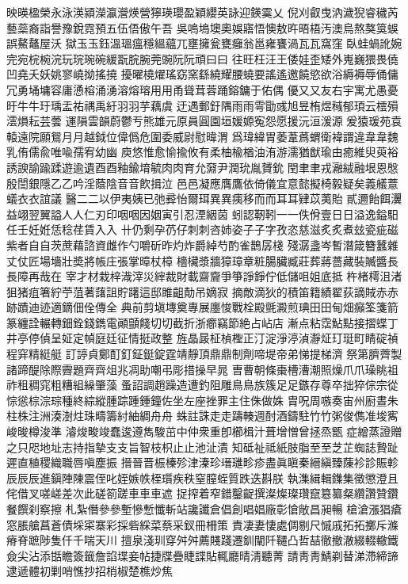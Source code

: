 映暎楹榮永泳渶潁濚瀛瀯煐營獰瑛瓔盈穎纓英詠迎鍈霙乂
倪刈叡曳汭濊猊睿穢芮藝蘂裔詣譽豫銳霓預五伍俉傲午吾
吳嗚塢墺奧娛寤悟懊敖旿晤梧汚澳烏熬獒筽蜈誤鰲鼇屋沃
獄⽟玉鈺溫瑥瘟穩縕蘊兀壅擁瓮甕癰翁邕雍饔渦⽡瓦窩窪
臥蛙蝸訛婉完宛梡椀浣玩琓琬碗緩翫脘腕莞豌阮阮頑⽈曰
往旺枉汪王倭娃歪矮外嵬巍猥畏僥凹堯夭妖姚寥嶢拗搖撓
擾曜橈燿瑤窈窯繇繞耀腰蟯要謠遙邀饒慾欲浴縟褥辱俑傭
冗勇埇墉容庸慂榕涌湧溶熔瑢⽤用甬聳茸蓉踊鎔鏞于佑偶
優⼜又友右宇寓尤愚憂旴⽜牛玗瑀盂祐禑禹紆⽻羽芋藕虞
迂遇郵釪隅⾬雨雩勖彧旭昱栯煜稶郁頊云橒殞澐熉耘芸蕓
運隕雲韻蔚鬱亐熊雄元原員圓園垣媛嫄寃怨愿援沅洹湲源
爰猿瑗苑袁轅遠院願鴛⽉月越鉞位偉僞危圍委威尉慰暐渭
爲瑋緯胃萎葦蔿蝟衛褘謂違⾱韋魏乳侑儒兪唯喩孺宥幼幽
庾悠惟愈愉揄攸有柔柚楡楢油洧游濡猶猷瑜由癒維臾萸裕
誘諛諭踰蹂遊逾遺⾣酉釉鍮堉毓⾁肉育允奫尹潤玧胤贇鈗
閏⾀聿戎瀜絨融垠恩慇殷誾銀隱⼄乙吟淫蔭陰⾳音飮揖泣
⾢邑凝應膺鷹依倚儀宜意懿擬椅毅疑矣義艤薏蟻⾐衣誼議
醫⼆二以伊夷姨已弛彛怡爾珥異異痍移⽽而⽿耳肄苡荑貽
貳邇飴餌瀷益翊翌翼謚⼈人仁刃印咽咽因姻寅引忍湮絪茵
蚓認靭靷⼀一佚佾壹⽇日溢逸鎰馹任壬妊姙恁稔荏賃⼊入
卄仍剩孕芿仔刺刺咨姉姿⼦子字孜恣慈滋炙炙煮玆瓷疵磁
紫者⾃自茨蔗藉諮資雌作勺嚼斫昨灼炸爵綽芍酌雀鵲孱棧
殘潺盞岑暫潛箴簪蠶雜丈仗匠場墻壯奬將帳庄張掌暲杖樟
檣欌漿牆獐璋章粧腸臟臧莊葬蔣薔藏裝贓醬⾧長障再哉在
宰才材栽梓渽滓災縡裁財載齋齎爭箏諍錚佇低儲咀姐底抵
杵楮樗沮渚狙猪疽箸紵苧菹著藷詛貯躇這邸雎齟勣吊嫡寂
摘敵滴狄的積笛籍績翟荻謫賊⾚赤跡蹟迪迹適鏑佃佺傳全
典前剪塡塼奠專展廛悛戰栓殿氈澱煎琠⽥田甸畑癲筌箋箭
篆纏詮輾轉鈿銓錢鐫電顚顫餞切切截折浙癤竊節絶占岾店
漸点粘霑鮎點接摺蝶丁井亭停偵呈姃定幀庭廷征情挺政整
旌晶晸柾楨檉正汀淀淨渟湞瀞炡玎珽町睛碇禎程穽精綎艇
訂諪貞鄭酊釘鉦鋌錠霆靖靜頂⿍鼎制劑啼堤帝弟悌提梯濟
祭第臍薺製諸蹄醍除際霽題⿑齊俎兆凋助嘲弔彫措操早晁
曺曹朝條棗槽漕潮照燥⽖爪璪眺祖祚租稠窕粗糟組繰肇藻
蚤詔調趙躁造遭釣阻雕⿃鳥族簇⾜足鏃存尊卒拙猝倧宗從
悰慫棕淙琮種終綜縱腫踪踵鍾鐘佐坐左座挫罪主住侏做姝
胄呪周嗾奏宙州廚晝朱柱株注洲湊澍炷珠疇籌紂紬綢⾈舟
蛛註誅⾛走躊輳週酎酒鑄駐⽵竹粥俊儁准埈寯峻晙樽浚準
濬焌畯竣蠢逡遵雋駿茁中仲衆重卽櫛楫汁葺增憎曾拯烝甑
症繒蒸證贈之只咫地址志持指摯⽀支旨智枝枳⽌止池沚漬
知砥祉祗紙肢脂⾄至芝芷蜘誌贄趾遲直稙稷織職唇嗔塵振
搢晉晋桭榛殄津溱珍瑨璡畛疹盡眞瞋秦縉縝臻蔯袗診賑軫
⾠辰辰進鎭陣陳震侄叱姪嫉帙桎瓆疾秩窒膣蛭質跌迭斟朕
執潗緝輯鏶集徵懲澄且侘借叉嗟嵯差次此磋箚蹉⾞車車遮
捉搾着窄錯鑿齪撰澯燦璨瓚竄簒纂粲纘讚贊鑽餐饌刹察擦
札紮僭參參塹慘慙懺斬站讒讖倉倡創唱娼廠彰愴敞昌昶暢
槍滄漲猖瘡窓脹艙菖蒼債埰寀寨彩採砦綵菜蔡采釵冊柵策
責凄妻悽處倜剔尺慽戚拓拓擲斥滌瘠脊蹠陟隻仟千喘天川
擅泉淺玔穿⾇舛薦賤踐遷釧闡阡韆凸哲喆徹撤澈綴輟轍鐵
僉尖沾添甛瞻簽籤詹諂堞妾帖捷牒疊睫諜貼輒廳晴淸聽菁
請⾭靑鯖剃替涕滯締諦逮遞體初剿哨憔抄招梢椒楚樵炒焦
